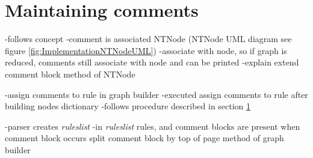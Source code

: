 \section{Maintaining comments}\label{sec:ConceptMaintainingComments}
-follows concept
-comment is associated NTNode (NTNode UML diagram see figure \ref{fig:ImplementationNTNodeUML})
-associate with node, so if graph is reduced, comments still associate with node and can be printed
-explain extend comment block method of NTNode

-assign comments to rule in graph builder
-executed assign comments to rule after building nodes dictionary
-follows procedure described in section \ref{sec:ConceptMaintainingComments}

-parser creates \textit{rules\textunderscore list}
-in \textit{rules\textunderscore list} rules, and comment blocks are present
when comment block occurs
split comment block by top of page method of graph builder

